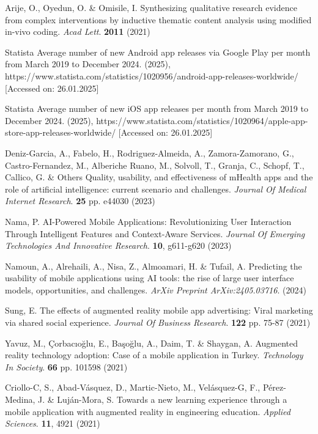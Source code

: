 \documentclass[preprint,12pt,number]{elsarticle}
\begin{document}
\begin{thebibliography}{00}
Arije, O., Oyedun, O. \& Omisile, I. Synthesizing qualitative research evidence from complex interventions by inductive thematic content analysis using modified in-vivo coding. {\em Acad Lett}. \textbf{2011} (2021)

Statista Average number of new Android app releases via Google Play per month from March 2019 to December 2024.  (2025), https://www.statista.com/statistics/1020956/android-app-releases-worldwide/ [Accessed on: 26.01.2025]

Statista Average number of new iOS app releases per month from March 2019 to December 2024.  (2025), https://www.statista.com/statistics/1020964/apple-app-store-app-releases-worldwide/ [Accessed on: 26.01.2025]

Deniz-Garcia, A., Fabelo, H., Rodriguez-Almeida, A., Zamora-Zamorano, G., Castro-Fernandez, M., Alberiche Ruano, M., Solvoll, T., Granja, C., Schopf, T., Callico, G. \& Others Quality, usability, and effectiveness of mHealth apps and the role of artificial intelligence: current scenario and challenges. {\em Journal Of Medical Internet Research}. \textbf{25} pp. e44030 (2023)

Nama, P. AI-Powered Mobile Applications: Revolutionizing User Interaction Through Intelligent Features and Context-Aware Services. {\em Journal Of Emerging Technologies And Innovative Research}. \textbf{10}, g611-g620 (2023)

Namoun, A., Alrehaili, A., Nisa, Z., Almoamari, H. \& Tufail, A. Predicting the usability of mobile applications using AI tools: the rise of large user interface models, opportunities, and challenges. {\em ArXiv Preprint ArXiv:2405.03716}. (2024)

Sung, E. The effects of augmented reality mobile app advertising: Viral marketing via shared social experience. {\em Journal Of Business Research}. \textbf{122} pp. 75-87 (2021)

Yavuz, M., Çorbacıoğlu, E., Başoğlu, A., Daim, T. \& Shaygan, A. Augmented reality technology adoption: Case of a mobile application in Turkey. {\em Technology In Society}. \textbf{66} pp. 101598 (2021)

Criollo-C, S., Abad-Vásquez, D., Martic-Nieto, M., Velásquez-G, F., Pérez-Medina, J. \& Luján-Mora, S. Towards a new learning experience through a mobile application with augmented reality in engineering education. {\em Applied Sciences}. \textbf{11}, 4921 (2021)


\end{thebibliography}
\end{document}
